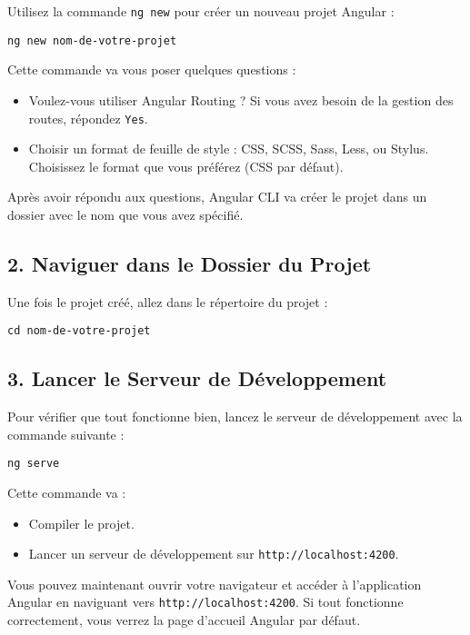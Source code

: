 \documentclass{article}
\begin{document}
Utilisez la commande \texttt{ng new} pour créer un nouveau projet Angular :
\begin{verbatim}
ng new nom-de-votre-projet
\end{verbatim}

Cette commande va vous poser quelques questions :
\begin{itemize}
    \item Voulez-vous utiliser Angular Routing ? Si vous avez besoin de la gestion des routes, répondez \texttt{Yes}.
    \item Choisir un format de feuille de style : CSS, SCSS, Sass, Less, ou Stylus. Choisissez le format que vous préférez (CSS par défaut).
\end{itemize}

Après avoir répondu aux questions, Angular CLI va créer le projet dans un dossier avec le nom que vous avez spécifié.

\subsection*{2. Naviguer dans le Dossier du Projet}
Une fois le projet créé, allez dans le répertoire du projet :
\begin{verbatim}
cd nom-de-votre-projet
\end{verbatim}

\subsection*{3. Lancer le Serveur de Développement}
Pour vérifier que tout fonctionne bien, lancez le serveur de développement avec la commande suivante :
\begin{verbatim}
ng serve
\end{verbatim}

Cette commande va :
\begin{itemize}
    \item Compiler le projet.
    \item Lancer un serveur de développement sur \texttt{http://localhost:4200}.
\end{itemize}

Vous pouvez maintenant ouvrir votre navigateur et accéder à l'application Angular en naviguant vers \texttt{http://localhost:4200}. Si tout fonctionne correctement, vous verrez la page d'accueil Angular par défaut.
\end{document}
